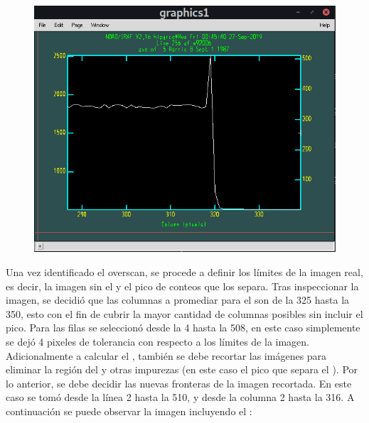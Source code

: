 \documentclass[12pt]{article}
\begin{document}
\begin{figure}[H]
  \centering
   \includegraphics[scale= 0.5]{im01.png}
  \label{im01}
\end{figure}



Una vez identificado el overscan, se procede a definir los límites de la imagen real, es decir, la imagen sin el   y el pico de conteos que los separa. Tras inspeccionar la imagen, se decidió que las columnas a promediar para el  son de la 325 hasta la 350, esto con el fin de cubrir la mayor cantidad de columnas posibles sin incluir el pico. Para las filas se seleccionó desde la 4 hasta la 508, en este caso simplemente se dejó 4 pixeles de tolerancia con respecto a los límites de la imagen.\\

Adicionalmente a calcular el , también se debe recortar las imágenes para eliminar la región del   y otras impurezas (en este caso el pico que separa el ). Por lo anterior, se debe decidir las nuevas fronteras de la imagen recortada. En este caso se tomó desde la línea 2 hasta la 510, y desde la columna 2 hasta la 316. A continuación se puede observar la imagen incluyendo el :
\end{document}
